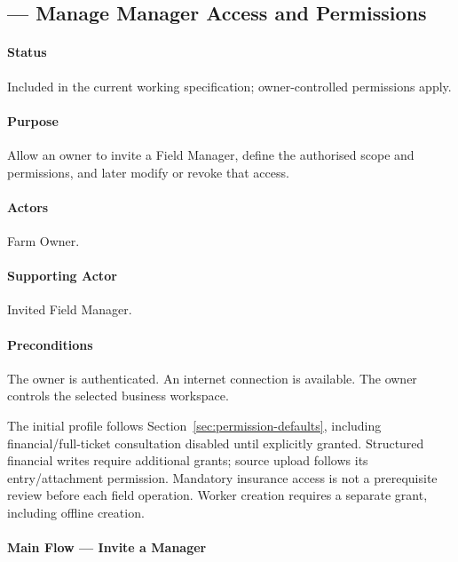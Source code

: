 \subsection{ --- Manage Manager Access and Permissions}
\label{uc:manage-manager-access}
\label{uc:04}

\paragraph{Status}

Included in the current working specification; owner-controlled permissions apply.

\paragraph{Purpose}

Allow an owner to invite a Field Manager, define the
    authorised scope and permissions, and later modify
    or revoke that access.

\paragraph{Actors}

Farm Owner.

\paragraph{Supporting Actor}

Invited Field Manager.

\paragraph{Preconditions}

The owner is authenticated.
    An internet connection is available.
    The owner controls the selected business workspace.

The initial profile follows Section~\ref{sec:permission-defaults}, including
financial/full-ticket consultation disabled until explicitly granted. Structured financial writes require
additional grants; source upload follows its entry/attachment permission. Mandatory
insurance access is not a prerequisite review before each field operation. Worker
creation requires a separate grant, including offline creation.

\paragraph{Main Flow --- Invite a Manager}

